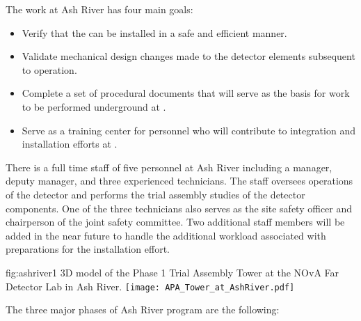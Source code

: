The work at Ash River has four main goals:
\begin{itemize}
  \item Verify that the   can be installed 
    in a safe and efficient manner.
  \item Validate mechanical design changes made to the detector
    elements subsequent to  operation.
  \item Complete a set of procedural documents that will serve 
    as the basis for work to be performed underground at 
    .
  \item Serve as a training center for personnel who will 
    contribute to  integration and installation 
    efforts at .
\end{itemize}

There is a full time staff of five personnel at Ash River including
a manager, deputy manager, and three experienced technicians.  The 
staff oversees operations of the  detector and performs 
the trial assembly studies of the  detector components.  
One of the three technicians also serves as the site safety officer 
and chairperson of the joint safety committee.  Two additional staff
members will be added in the near future to handle the additional 
workload associated with preparations for the  
installation effort.  

\begin{dunefigure}{fig:ashriver1}
  {3D model of the Phase 1 Trial Assembly  Tower at the NOvA Far Detector
    Lab in Ash River.}
  \texttt{[image: APA\_Tower\_at\_AshRiver.pdf]}
\end{dunefigure}

The three major phases of Ash River program are the following:

